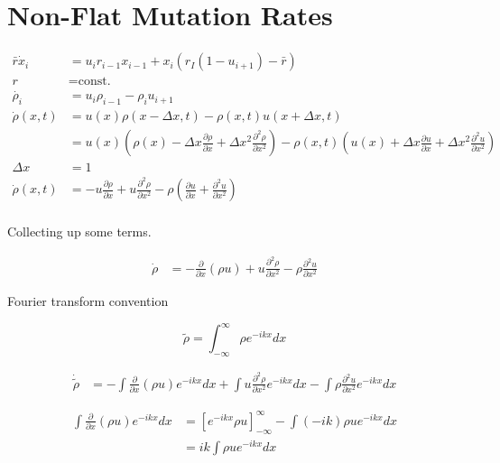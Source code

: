 \documentclass[a4paper]{article}
\begin{document}
\section{Non-Flat Mutation Rates}

\begin{align*}
\bar{r} \dot{x}_i & = u_{i} r_{i-1} x_{i-1} + x_{i} ( r_I ( 1- u_{i+1} ) - \bar{r} ) \\
r & = \text{const.} \\
\dot{\rho _i} & = u_i \rho _{i-1} - \rho _{i} u_{i+1} \\
\dot{\rho} (x, t) & = u(x) \rho (x - \Delta x, t) - \rho (x,t) u(x + \Delta x , t) \\
& = u(x) \left( \rho (x) - \Delta x \frac{\partial \rho}{\partial x} + \Delta x ^2 \frac{\partial ^2 \rho}{\partial x ^ 2} \right) - \rho (x, t) \left( u(x) + \Delta x \frac{\partial u}{\partial x} + \Delta x ^2 \frac{\partial ^2 u }{\partial x ^2} \right) \\
\Delta x & = 1 \\
\dot{\rho} (x, t) & = - u \frac{\partial \rho}{\partial x} + u \frac{\partial ^2 \rho}{\partial x ^2} - \rho \left( \frac{\partial u}{\partial x} + \frac{\partial ^2 u}{\partial x ^2} \right) \\
\end{align*}

Collecting up some terms. 

\begin{align*}
\dot{\rho} & = - \frac{\partial}{\partial x} ( \rho u ) + u \frac{\partial ^2 \rho}{\partial x ^2} - \rho \frac{\partial ^2 u}{\partial x ^2}
\end{align*}

Fourier transform convention 

\begin{equation}
\tilde{\rho} = \int _{- \infty} ^{\infty} \rho e ^{-ikx } dx 
\end{equation}

\begin{align*}
\dot{\tilde{\rho}} & = - \int \frac{\partial}{\partial x} (\rho u) e^{-ikx} dx + \int u \frac{\partial ^2 \rho}{\partial x^2} e^{-ikx} dx - \int \rho \frac{\partial ^2 u}{\partial x ^2 } e^{-ikx} dx
\end{align*}

\begin{align*}
\int \frac{\partial}{\partial x} (\rho u) e^{-ikx} dx & = \left[ e^{-ikx} \rho u \right] _{-\infty} ^{\infty} - \int (-ik) \rho u e^{-ikx} dx \\
& = ik \int \rho u e^{-ikx} dx
\end{align*}
\end{document}
